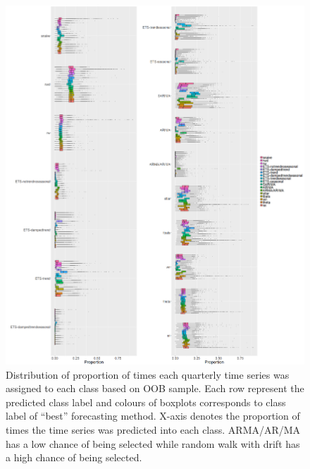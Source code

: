\documentclass[11pt,a4paper,]{article}
\begin{document}
\begin{figure}
\centering
\includegraphics{figures/oobquarterlymonthly1-1.png}
\caption{\label{fig:oobquarterlymonthly1}Distribution of proportion of times
each quarterly time series was assigned to each class based on OOB
sample. Each row represent the predicted class label and colours of
boxplots corresponds to class label of ``best'' forecasting method.
X-axis denotes the proportion of times the time series was predicted
into each class. ARMA/AR/MA has a low chance of being selected while
random walk with drift has a high chance of being selected.}
\end{figure}

\clearpage
\end{document}
